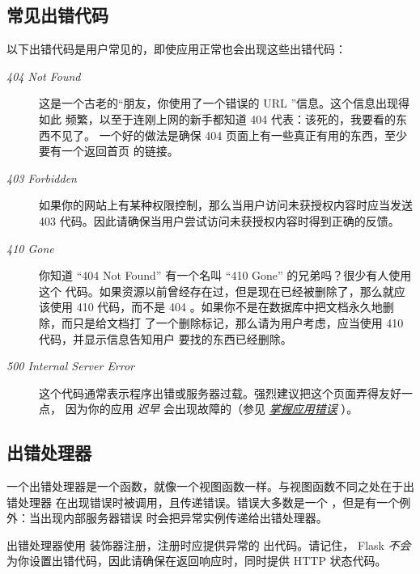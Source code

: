 \documentclass[a4paper,12pt]{sphinxmanual}
\begin{document}
\subsection{常见出错代码}
\label{patterns/errorpages:id2}
以下出错代码是用户常见的，即使应用正常也会出现这些出错代码：
\begin{description}
\item[{\emph{404 Not Found}}] \leavevmode
这是一个古老的“朋友，你使用了一个错误的 URL ”信息。这个信息出现得如此
频繁，以至于连刚上网的新手都知道 404 代表：该死的，我要看的东西不见了。
一个好的做法是确保 404 页面上有一些真正有用的东西，至少要有一个返回首页
的链接。

\item[{\emph{403 Forbidden}}] \leavevmode
如果你的网站上有某种权限控制，那么当用户访问未获授权内容时应当发送 403
代码。因此请确保当用户尝试访问未获授权内容时得到正确的反馈。

\item[{\emph{410 Gone}}] \leavevmode
你知道 ``404 Not Found'' 有一个名叫 ``410 Gone'' 的兄弟吗？很少有人使用这个
代码。如果资源以前曾经存在过，但是现在已经被删除了，那么就应该使用 410
代码，而不是 404 。如果你不是在数据库中把文档永久地删除，而只是给文档打
了一个删除标记，那么请为用户考虑，应当使用 410 代码，并显示信息告知用户
要找的东西已经删除。

\item[{\emph{500 Internal Server Error}}] \leavevmode
这个代码通常表示程序出错或服务器过载。强烈建议把这个页面弄得友好一点，
因为你的应用 \emph{迟早} 会出现故障的（参见 {\hyperref[errorhandling:application-errors]{\emph{掌握应用错误}}} ）。

\end{description}


\subsection{出错处理器}
\label{patterns/errorpages:id3}
一个出错处理器是一个函数，就像一个视图函数一样。与视图函数不同之处在于出错处理器
在出现错误时被调用，且传递错误。错误大多数是一个
\href{http://werkzeug.pocoo.org/docs/exceptions/\#werkzeug.exceptions.HTTPException}{} ，但是有一个例外：当出现内部服务器错误
时会把异常实例传递给出错处理器。

出错处理器使用 {\hyperref[api:flask.Flask.errorhandler]{}} 装饰器注册，注册时应提供异常的
出代码。请记住， Flask \emph{不会} 为你设置出错代码，因此请确保在返回响应时，同时提供
HTTP 状态代码。
\end{document}
